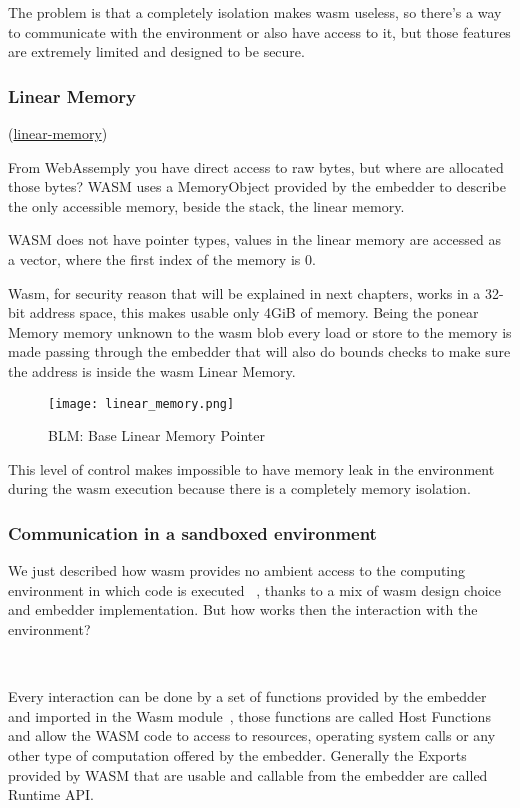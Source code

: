 \documentclass[../main.tex]{subfiles}
\begin{document}
The problem is that a completely isolation makes wasm useless, so there's a way to communicate with the environment or also have access to it, but those features are extremely limited and designed to be secure.

\subsubsection{Linear Memory}
(\href{}{linear-memory})

From WebAssemply you have direct access to raw bytes, but where are allocated those bytes? WASM uses a MemoryObject provided by the embedder to describe the only accessible memory, beside the stack, the linear memory.~\cite{linear-memory}

WASM does not have pointer types, values in the linear memory are accessed as a vector, where the first index of the memory is 0.

Wasm, for security reason that will be explained in next chapters, works in a 32-bit address space, this makes usable only 4GiB of memory. Being the ponear Memory memory unknown to the wasm blob every load or store to the memory is made passing through the embedder that will also do bounds checks to make sure the address is inside the wasm Linear Memory.

\begin{figure}[h]
  \centering
  \texttt{[image: linear\_memory.png]}
  \caption{BLM: Base Linear Memory Pointer}
  \label{fig:linear_memory}
\end{figure}

This level of control makes impossible to have memory leak in the environment during the wasm execution because there is a completely memory isolation. ~\cite{linear-memory}

\subsubsection{Communication in a sandboxed environment}

We just described how wasm provides no ambient access to the computing environment in which code is executed ~\cite{wasm-core-spec}, thanks to a mix of wasm design choice and embedder implementation. But how works then the interaction with the environment?

\

Every interaction can be done by a set of functions provided by the embedder and imported in the Wasm module~\cite{wasm-core-spec}, those functions are called Host Functions and allow the WASM code to access to resources, operating system calls or any other type of computation offered by the embedder. Generally the Exports provided by WASM that are usable and callable from the embedder are called Runtime API.
\end{document}
